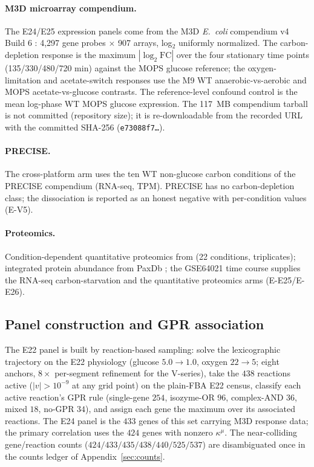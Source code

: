 \documentclass[11pt,a4paper]{article}
\theoremstyle{plain}
\theoremstyle{definition}
\theoremstyle{remark}
\newcommand{\kmu}{\kappa^{\mu}}
\begin{document}
\paragraph{M3D microarray compendium.} The E24/E25 expression panels
come from the M3D \emph{E.~coli} compendium v4 Build 6
\citep{faith2008, faith2007}: 4{,}297 gene probes $\times$ 907
arrays, log$_2$ uniformly normalized. The carbon-depletion response
is the maximum $|\log_2\mathrm{FC}|$ over the four stationary
time points (135/330/480/720 min) against the MOPS glucose
reference; the oxygen-limitation and acetate-switch responses use
the M9 WT anaerobic-vs-aerobic and MOPS acetate-vs-glucose
contrasts. The reference-level confound control is the mean
log-phase WT MOPS glucose expression. The 117~MB compendium
tarball is not committed (repository size); it is re-downloadable
from the recorded URL with the committed SHA-256
(\texttt{e73088f7\ldots}).

\paragraph{PRECISE.} The cross-platform arm uses the ten WT
non-glucose carbon conditions of the PRECISE compendium
\citep{sastry2019} (RNA-seq, TPM). PRECISE has no
carbon-depletion class; the dissociation is reported as an honest
negative with per-condition values (E-V5).

\paragraph{Proteomics.} Condition-dependent quantitative proteomics
from \citet{schmidt2016} (22 conditions, triplicates); integrated
protein abundance from PaxDb \citep{wang2015}; the GSE64021
\citep{barrett2013} time course supplies the RNA-seq
carbon-starvation and the quantitative proteomics arms (E-E25/E-E26).

\subsection{Panel construction and GPR association}

The E22 panel is built by reaction-based sampling: solve the
lexicographic trajectory on the E22 physiology (glucose $5.0 \to
1.0$, oxygen $22 \to 5$; eight anchors, $8\times$ per-segment
refinement for the V-series), take the $438$ reactions active
($|v| > 10^{-9}$ at any grid point) on the plain-FBA E22 census,
classify each active reaction's GPR rule (single-gene $254$,
isozyme-OR $96$, complex-AND $36$, mixed $18$, no-GPR $34$), and
assign each gene the maximum over its associated reactions. The
E24 panel is the $433$ genes of this set carrying M3D response
data; the primary correlation uses the $424$ genes with nonzero
$\kmu$. The near-colliding gene/reaction counts
($424/433/435/438/440/525/537$) are disambiguated once in the
counts ledger of Appendix~\ref{sec:counts}.
\end{document}
